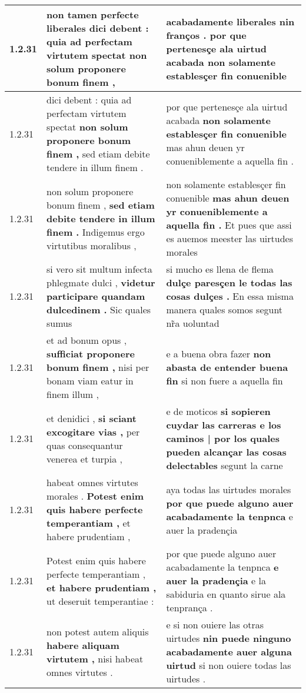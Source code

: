 \begin{tabular}{|p{1cm}|p{6.5cm}|p{6.5cm}|}
1.2.31 & non tamen perfecte liberales \textbf{ dici debent : quia ad perfectam virtutem spectat } non solum proponere bonum finem , & acabadamente liberales nin franços . \textbf{ por que pertenesçe ala uirtud acabada } non solamente establesçer fin conuenible \\\hline
1.2.31 & dici debent : quia ad perfectam virtutem spectat \textbf{ non solum proponere bonum finem , } sed etiam debite tendere in illum finem . & por que pertenesçe ala uirtud acabada \textbf{ non solamente establesçer fin conuenible } mas ahun deuen yr conueniblemente a aquella fin . \\\hline
1.2.31 & non solum proponere bonum finem , \textbf{ sed etiam debite tendere in illum finem . } Indigemus ergo virtutibus moralibus , & non solamente establesçer fin conuenible \textbf{ mas ahun deuen yr conueniblemente a aquella fin . } Et pues que assi es auemos meester las uirtudes morales \\\hline
1.2.31 & si vero sit multum infecta phlegmate dulci , \textbf{ videtur participare quandam dulcedinem . } Sic quales sumus & si mucho es llena de flema \textbf{ dulçe paresçen le todas las cosas dulçes . } En essa misma manera quales somos segunt nr̃a uoluntad \\\hline
1.2.31 & et ad bonum opus , \textbf{ sufficiat proponere bonum finem , } nisi per bonam viam eatur in finem illum , & e a buena obra fazer \textbf{ non abasta de entender buena fin } si non fuere a aquella fin \\\hline
1.2.31 & et denidici , \textbf{ si sciant excogitare vias , } per quas consequantur venerea et turpia , & e de moticos \textbf{ si sopieren cuydar las carreras e los caminos | por los quales pueden alcançar las cosas delectables } segunt la carne \\\hline
1.2.31 & habeat omnes virtutes morales . \textbf{ Potest enim quis habere perfecte temperantiam , } et habere prudentiam , & aya todas las uirtudes morales \textbf{ por que puede alguno auer acabadamente la tenpnca } e auer la pradençia \\\hline
1.2.31 & Potest enim quis habere perfecte temperantiam , \textbf{ et habere prudentiam , } ut deseruit temperantiae : & por que puede alguno auer acabadamente la tenpnca \textbf{ e auer la pradençia } e la sabiduria en quanto sirue ala tenprança . \\\hline
1.2.31 & non potest autem aliquis \textbf{ habere aliquam virtutem , } nisi habeat omnes virtutes . & e si non ouiere las otras uirtudes \textbf{ nin puede ninguno acabadamente auer alguna uirtud } si non ouiere todas las uirtudes . \\\hline

\end{tabular}
